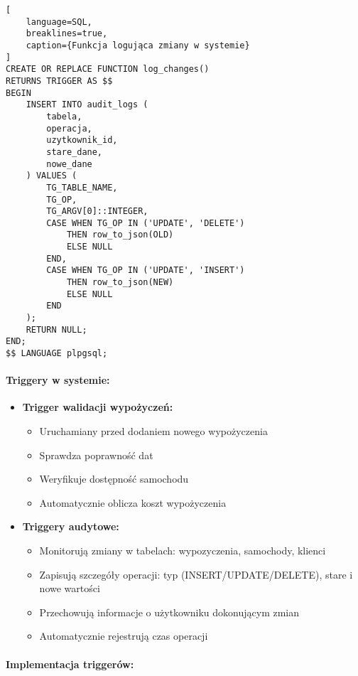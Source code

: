 \documentclass[12pt]{article}
\begin{document}
\begin{lstlisting}[
    language=SQL,
    breaklines=true,
    caption={Funkcja logująca zmiany w systemie}
]
CREATE OR REPLACE FUNCTION log_changes()
RETURNS TRIGGER AS $$
BEGIN
    INSERT INTO audit_logs (
        tabela,
        operacja,
        uzytkownik_id,
        stare_dane,
        nowe_dane
    ) VALUES (
        TG_TABLE_NAME,
        TG_OP,
        TG_ARGV[0]::INTEGER,
        CASE WHEN TG_OP IN ('UPDATE', 'DELETE') 
            THEN row_to_json(OLD) 
            ELSE NULL 
        END,
        CASE WHEN TG_OP IN ('UPDATE', 'INSERT') 
            THEN row_to_json(NEW) 
            ELSE NULL 
        END
    );
    RETURN NULL;
END;
$$ LANGUAGE plpgsql;
\end{lstlisting}

\paragraph{Triggery w systemie:}
\begin{itemize}
    \item \textbf{Trigger walidacji wypożyczeń:}
    \begin{itemize}
        \item Uruchamiany przed dodaniem nowego wypożyczenia
        \item Sprawdza poprawność dat
        \item Weryfikuje dostępność samochodu
        \item Automatycznie oblicza koszt wypożyczenia
    \end{itemize}

    \item \textbf{Triggery audytowe:}
    \begin{itemize}
        \item Monitorują zmiany w tabelach: wypozyczenia, samochody, klienci
        \item Zapisują szczegóły operacji: typ (INSERT/UPDATE/DELETE), stare i nowe wartości
        \item Przechowują informacje o użytkowniku dokonującym zmian
        \item Automatycznie rejestrują czas operacji
    \end{itemize}
\end{itemize}

\paragraph{Implementacja triggerów:}
\end{document}
